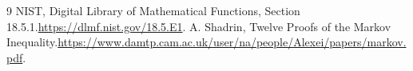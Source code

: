 \documentclass[11pt]{article}
\begin{document}

\begin{thebibliography}{9}
 NIST, Digital Library of Mathematical Functions, Section 18.5.1.\url{https://dlmf.nist.gov/18.5.E1}.
 A. Shadrin, Twelve Proofs of the Markov Inequality.\url{https://www.damtp.cam.ac.uk/user/na/people/Alexei/papers/markov.pdf}.
\end{thebibliography}
\end{document}
